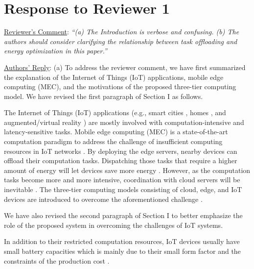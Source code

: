 \documentclass[12pt,draftclsnofoot,onecolumn]{IEEEtran}
\newcommand{\rev}[1]{{\color{blue}#1}} %
\newcommand{\rev}[1]{#1}
\newenvironment{my}[2]%
{\begin{list}{}%
{\setlength{\rightmargin}{#1}\setlength{\leftmargin}{#2}}%


 \item[]{}

} {\end{list}}
\begin{document}
\section{Response to Reviewer 1}
\begin{enumerate}
	
	\item \underline{Reviewer's Comment}: \textit{``(a) The Introduction is verbose and confusing. (b) The authors should consider clarifying the relationship between task offloading and energy optimization in this paper.''} \newline

\underline{Authors' Reply}: (a) To address the reviewer comment, we have first summarized the explanation of the Internet of Things (IoT) applications, mobile edge computing (MEC), and the motivations of the proposed three-tier computing model. We have revised the first paragraph of Section I as follows.\\

\begin{my}{1cm}{1cm}
	\rev{The Internet of Things (IoT) applications (e.g., smart cities \cite{b1}, homes \cite{b3}, and augmented/virtual reality \cite{b11}) are mostly involved with computation-intensive and latency-sensitive tasks. Mobile edge computing (MEC) is a state-of-the-art computation paradigm to address the challenge of insufficient computing resources in IoT networks \cite{b35, b4}. By deploying the edge servers, nearby devices can offload their computation tasks. Dispatching those tasks that require a higher amount of energy will let devices save more energy \cite{b38}. However, as the computation tasks become more and more intensive, coordination with cloud servers will be inevitable \cite{b37}. The three-tier computing models consisting of cloud, edge, and IoT devices are introduced to overcome the aforementioned challenge \cite{b5,b6,b39,b40}. }\newline
\end{my}

We have also revised the second paragraph of Section I to better emphasize the role of the proposed system in overcoming the challenges of IoT systems.\\	

\begin{my}{1cm}{1cm}
	\rev{In addition to their restricted computation resources, IoT devices usually have small battery capacities which is mainly due to their small form factor and the constraints of the production cost \cite{b1}.
	
}
\end{my}
\end{enumerate}
\end{document}
